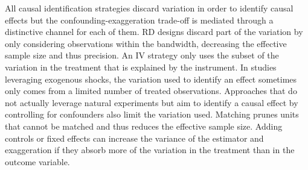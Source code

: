 			
			All causal identification strategies discard variation in order to identify causal effects but the confounding-exaggeration trade-off is mediated through a distinctive channel for each of them. RD designs discard part of the variation by only considering observations within the bandwidth, decreasing the effective sample size and thus precision. An IV strategy only uses the subset of the variation in the treatment that is explained by the instrument. In studies leveraging exogenous shocks, the variation used to identify an effect sometimes only comes from a limited number of treated observations. Approaches that do not actually leverage natural experiments but aim to identify a causal effect by controlling for confounders also limit the variation used. 
			Matching prunes units that cannot be matched and thus reduces the effective sample size. 
			Adding controls or fixed effects can increase the variance of the estimator and exaggeration if they absorb more of the variation in the treatment than in the outcome variable. 
			

